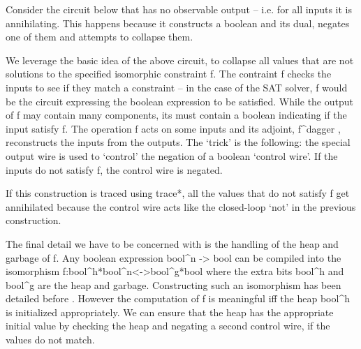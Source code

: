 \documentclass[preprint]{sigplanconf}
\begin{document}
{Consider the circuit below that has no observable output -- i.e. for
all inputs it is annihilating. This happens because it constructs a
boolean and its dual, negates one of them and attempts to collapse
them.
\begin{center}
\end{center}  

We leverage the basic idea of the above circuit, to collapse all
values that are not solutions to the specified isomorphic constraint
{{f}}. The contraint {{f}} checks the inputs to see if they match a
constraint -- in the case of the SAT solver, {{f}} would be the
circuit expressing the boolean expression to be satisfied.  While the
output of {{f}} may contain many components, its must contain a
boolean indicating if the input satisfy {{f}}. The operation {{f}}
acts on some inputs and its adjoint, {{f^{dagger} }}, reconstructs the
inputs from the outputs.  The `trick' is the following: the special
output wire is used to `control' the negation of a boolean `control
wire'.  If the inputs do not satisfy {{f}}, the control wire is
negated.

\begin{center}
\end{center}  

If this construction is traced using {{trace*}}, all the values that
do not satisfy {{f}} get annihilated because the control wire acts
like the closed-loop `not' in the previous construction. 

The final detail we have to be concerned with is the handling of the
heap and garbage of {{f}}. Any boolean expression {{bool^n -> bool}}
can be compiled into the isomorphism {{f:bool^h*bool^n<->bool^g*bool}}
where the extra bits {{bool^h}} and {{bool^g}} are the heap and
garbage. Constructing such an isomorphism has been detailed before
\cite{Toffoli:1980,infeffects}.  However the computation of {{f}} is
meaningful {{iff}} the heap {{bool^h}} is initialized appropriately. We
can ensure that the heap has the appropriate initial value by checking
the heap and negating a second control wire, if the values do not
match.

}
\end{document}
